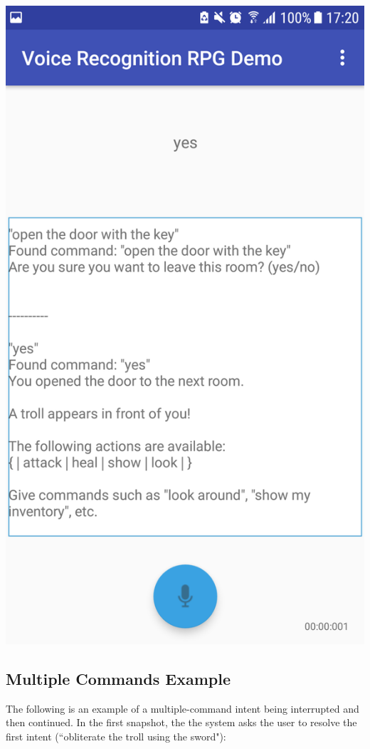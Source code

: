\documentclass[11pt]{article}
\begin{document}
\begin{appendices}
\begin{center}
\includegraphics[scale=0.18]{overworld-4.png}
\end{center}

\newpage
\subsection{Multiple Commands Example}
\label{appendix:multiple-commands-ex}
The following is an example of a multiple-command intent being interrupted and then continued. In the first snapshot, the the system asks the user to resolve the first intent (``obliterate the troll using the sword"):


\end{appendices}
\end{document}
